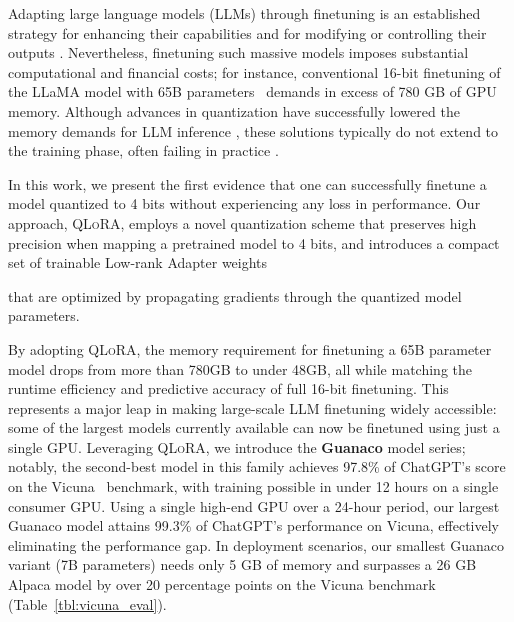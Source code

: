 Adapting large language models (LLMs) through finetuning is an established strategy for enhancing their capabilities \citep{min2021metaicl, wei2021finetuned, ouyang2022training, wang2022super, wang2022self, liu2022few} and for modifying or controlling their outputs \citep{ouyang2022training,askell2021general,bai2022training}. Nevertheless, finetuning such massive models imposes substantial computational and financial costs; for instance, conventional 16-bit finetuning of the LLaMA model with 65B parameters~\citep{touvron2023llama} demands in excess of 780 GB of GPU memory. Although advances in quantization have successfully lowered the memory demands for LLM inference \citep{dettmers2022llm, dettmers2022case, frantar2022gptq, xiao2022smoothquant}, these solutions typically do not extend to the training phase, often failing in practice \citep{wortsman2023stable}. 

In this work, we present the first evidence that one can successfully finetune a model quantized to 4 bits without experiencing any loss in performance. Our approach, \textsc{QLoRA}, employs a novel quantization scheme that preserves high precision when mapping a pretrained model to 4 bits, and introduces a compact set of trainable Low-rank Adapter weights \citep{hu2021lora} 

that are optimized by propagating gradients through the quantized model parameters.

By adopting \textsc{QLoRA}, the memory requirement for finetuning a 65B parameter model drops from more than 780GB to under 48GB, all while matching the runtime efficiency and predictive accuracy of full 16-bit finetuning. This represents a major leap in making large-scale LLM finetuning widely accessible: some of the largest models currently available can now be finetuned using just a single GPU. Leveraging \textsc{QLoRA}, we introduce the \textbf{Guanaco} model series; notably, the second-best model in this family achieves 97.8\% of ChatGPT's score on the Vicuna~\citep{vicuna2023} benchmark, with training possible in under 12 hours on a single consumer GPU. Using a single high-end GPU over a 24-hour period, our largest Guanaco model attains 99.3\% of ChatGPT's performance on Vicuna, effectively eliminating the performance gap. In deployment scenarios, our smallest Guanaco variant (7B parameters) needs only 5 GB of memory and surpasses a 26 GB Alpaca model by over 20 percentage points on the Vicuna benchmark (Table~\ref{tbl:vicuna_eval}).

